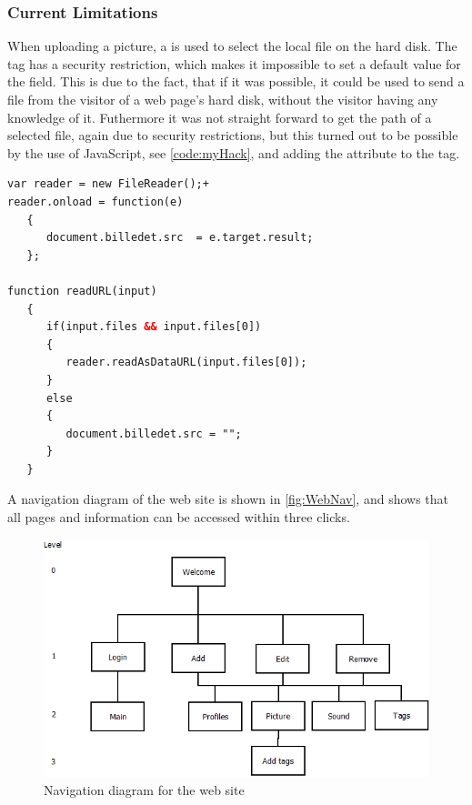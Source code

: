 \subsubsection{Current Limitations}
When uploading a picture, a  is used to select the local file on the hard disk. The  tag has a security restriction, which makes it impossible to set a default value for the field. This is due to the fact, that if it was possible, it could be used to send a file from the visitor of a web page's hard disk, without the visitor having any knowledge of it\cite{noFile}. Futhermore it was not straight forward to get the path of a selected file, again due to security restrictions, but this turned out to be possible by the use of JavaScript, see \autoref{code:myHack}, and adding the attribute  to the  tag.

\begin{Code}
\begin{lstlisting}[language=HTML,label=code:myHack,caption=Hack to load file from \code{file} box]
var reader = new FileReader();+
reader.onload = function(e) 
   {
      document.billedet.src  = e.target.result;
   };

function readURL(input)
   {
      if(input.files && input.files[0])
      {
         reader.readAsDataURL(input.files[0]);
      }
      else 
      {
         document.billedet.src = "";
      }
   }
\end{lstlisting}
\end{Code}

A navigation diagram of the web site is shown in \autoref{fig:WebNav}, and shows that all pages and information can be accessed within three clicks.

\begin{figure}
	\centering
		\includegraphics[width=1.00\textwidth]{images/WebNav.png}
	\caption{Navigation diagram for the web site}
	\label{fig:WebNav}
\end{figure}
